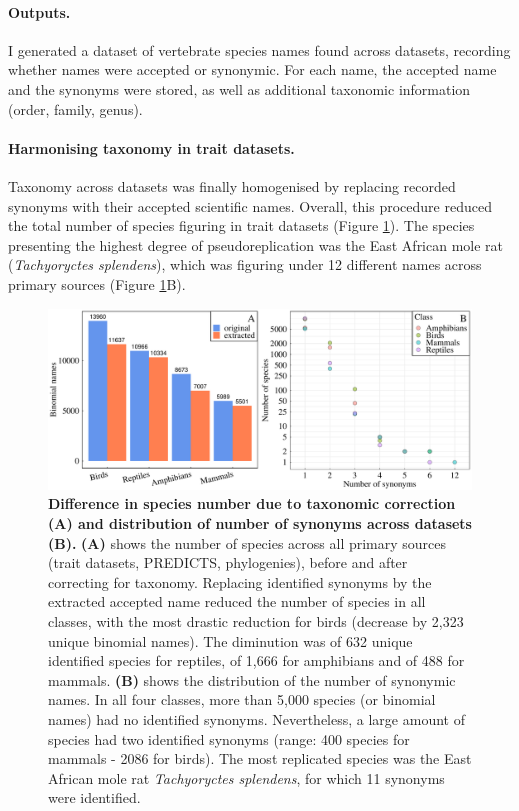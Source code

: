 \paragraph{Outputs.} I generated a dataset of vertebrate species names found across datasets, recording whether names were accepted or synonymic. For each name, the accepted name and the synonyms were stored, as well as additional taxonomic information (order, family, genus).

\paragraph{Harmonising taxonomy in trait datasets.}
Taxonomy across datasets was finally homogenised by replacing recorded synonyms with their accepted scientific names. Overall, this procedure  reduced the total number of species figuring in trait datasets (Figure \ref{taxcor}). The species presenting the highest degree of pseudoreplication was the East African mole rat (\textit{Tachyoryctes splendens}), which was figuring under 12 different names across primary sources (Figure \ref{taxcor}B).

\vspace{0.5cm}
\begin{figure}[h!]
\includegraphics[scale=0.45]{figures/chapter2/Taxonomic_corrections/tax_corrections}
\caption[Difference in species number due to taxonomic correction (A) and distribution of number of synonyms across datasets (B)]{\textbf{Difference in species number due to taxonomic correction (A) and distribution of number of synonyms across datasets (B).} \textbf{(A)} shows the number of species across all primary sources (trait datasets, PREDICTS, phylogenies), before and after correcting for taxonomy. Replacing identified synonyms by the extracted accepted name reduced the number of species in all classes, with the most drastic reduction for birds (decrease by 2,323 unique binomial names). The diminution was of 632 unique identified species for reptiles, of 1,666 for amphibians and of 488 for mammals. \textbf{(B)} shows the distribution of the number of synonymic names. In all four classes, more than 5,000 species (or binomial names) had no identified synonyms. Nevertheless, a large amount of species had two identified synonyms (range: 400 species for mammals - 2086 for birds). The most replicated species was the East African mole rat \textit{Tachyoryctes splendens}, for which 11 synonyms were identified.}
\label{taxcor}
\end{figure}


